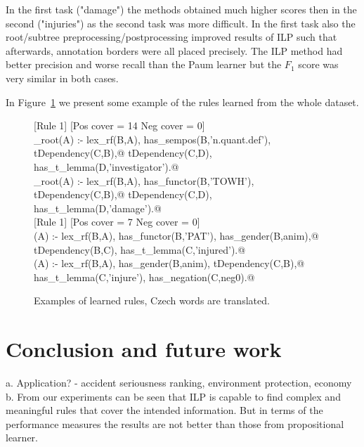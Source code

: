 \documentclass[runningheads,a4paper]{llncs}
\begin{document}
In the first task ("damage") the methods obtained much higher scores then in the second ("injuries") as the second task was more difficult. In the first task also the root/subtree preprocessing/postprocessing improved results of ILP such that afterwards, annotation borders were all placed precisely. The ILP method had better precision and worse recall than the Paum learner but the $F_1$ score was very similar in both cases.


In Figure~\ref{fig:rules} we present some example of the rules learned from the whole dataset.

\begin{figure}
	\scriptsize
[Rule 1] [Pos cover = 14 Neg cover = 0]\\
\verb@damage_root(A) :- lex_rf(B,A), has_sempos(B,'n.quant.def'), tDependency(C,B),@
\verb@   tDependency(C,D), has_t_lemma(D,'investigator').@ %
\smallskip\newline
[Rule 2] [Pos cover = 13 Neg cover = 0]\\
\verb@damage_root(A) :- lex_rf(B,A), has_functor(B,'TOWH'), tDependency(C,B),@
\verb@   tDependency(C,D), has_t_lemma(D,'damage').@\\


[Rule 1] [Pos cover = 7 Neg cover = 0]\\
\verb@injuries(A) :- lex_rf(B,A), has_functor(B,'PAT'), has_gender(B,anim),@
\verb@   tDependency(B,C), has_t_lemma(C,'injured').@
\smallskip\newline
[Rule 8] [Pos cover = 6 Neg cover = 0]\\
\verb@injuries(A) :- lex_rf(B,A), has_gender(B,anim), tDependency(C,B),@
\verb@   has_t_lemma(C,'injure'), has_negation(C,neg0).@
	\caption{Examples of learned rules, Czech words are translated.}
	\label{fig:rules}
\end{figure}















\section{Conclusion and future work}
a.	Application? - accident seriousness ranking, environment protection, economy
\\b.	From our experiments can be seen that ILP is capable to find complex and meaningful rules that cover the intended information. But in terms of the performance measures the results are not better than those from propositional learner.
\end{document}
